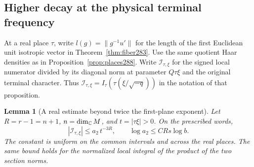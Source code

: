 \documentclass[a4paper,11pt]{article}
\newtheorem{lemma}[proposition]{Lemma}
\theoremstyle{definition}
\theoremstyle{remark}
\numberwithin{equation}{section}
\begin{document}
\subsection{Higher decay at the physical terminal frequency}\label{nav:VII-55}
At a real place \(\tau\), write \(l(g)=\|g^{-1}u'\|\) for
the length of the first Euclidean unit isotropic vector
in Theorem~\ref{thm:fiber283}. Use the same quotient Haar
densities as in Proposition~\ref{prop:places288}. Write
\(\mathcal I_{\tau,\xi}\) for the signed local numerator divided by
its diagonal norm at parameter \(Q\tau\xi\) and the original
terminal character. Thus \(\mathcal I_{\tau,\xi}=I_\tau(\tau(\xi/\sqrt{-q}))\)
in the notation of that proposition.

\begin{lemma}[A real estimate beyond twice the first-plane exponent]\leavevmode
\label{lem:power291}
Let \(R=r-1=n+1\), \(n=\dim_{\mathbb C} M\), and
\(t=|\tau\xi|>0\). On the prescribed words,
\[
       |\mathcal I_{\tau,\xi}|\le a_2\,t^{-3R},\qquad
                       \log a_2\le C R s\log b .
\]
The constant is uniform on the common intervals and across
the real places. The same bound holds for the normalized
local integral of the product of the two section norms.
\end{lemma}
\end{document}
